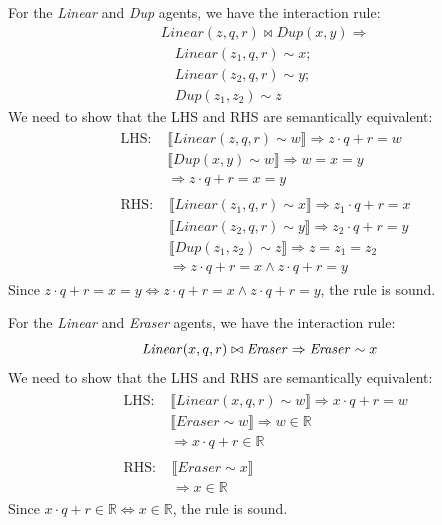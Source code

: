 \begin{lemma}
	For the \textit{Linear} and \textit{Dup} agents, we have the interaction rule:
	$$
	\begin{aligned}
		& \mathit{Linear}(z, q, r) \bowtie \mathit{Dup}(x, y) \Rightarrow \\
		& \quad \mathit{Linear}(z_1, q, r) \sim x; \\
		& \quad \mathit{Linear}(z_2, q, r) \sim y;	\\
		& \quad \mathit{Dup}(z_1, z_2) \sim z
	\end{aligned}
	$$
	We need to show that the LHS and RHS are semantically equivalent:
	$$
	\begin{aligned}
		& \begin{aligned}
			\text{LHS: } & \llbracket \mathit{Linear}(z, q, r) \sim w \rrbracket \Rightarrow z\cdot q + r = w \\
			& \llbracket \mathit{Dup}(x, y) \sim w \rrbracket \Rightarrow w = x = y \\
			& \Rightarrow z \cdot q + r = x = y
		\end{aligned} \\
		& \begin{aligned}
			\text{RHS: } & \llbracket \mathit{Linear}(z_1, q, r) \sim x \rrbracket \Rightarrow z_1 \cdot q + r = x \\
			& \llbracket \mathit{Linear}(z_2, q, r) \sim y \rrbracket \Rightarrow z_2 \cdot q + r = y \\
			& \llbracket \mathit{Dup}(z_1, z_2) \sim z \rrbracket \Rightarrow z = z_1 = z_2 \\
			& \Rightarrow z \cdot q + r = x \land z \cdot q + r = y
		\end{aligned}
	\end{aligned}
	$$
	Since $z \cdot q + r = x = y \iff z \cdot q + r = x \land z \cdot q + r = y$, the rule is sound.
\end{lemma}

\begin{lemma}
	For the \textit{Linear} and \textit{Eraser} agents, we have the interaction rule:
	$$
	\mathit{Linear}(x, q, r) \bowtie \mathit{Eraser} \Rightarrow \mathit{Eraser} \sim x \\
	$$
	We need to show that the LHS and RHS are semantically equivalent:
	$$
	\begin{aligned}
		& \begin{aligned}
			\text{LHS: } & \llbracket \mathit{Linear}(x, q, r) \sim w \rrbracket \Rightarrow x\cdot q + r = w \\
			& \llbracket \mathit{Eraser} \sim w \rrbracket \Rightarrow w \in \mathbb{R} \\
			& \Rightarrow x \cdot q + r \in \mathbb{R}
		\end{aligned} \\
		& \begin{aligned}
			\text{RHS: } & \llbracket \mathit{Eraser} \sim x \rrbracket \\
			& \Rightarrow x \in \mathbb{R}
		\end{aligned}
	\end{aligned}
	$$
	Since $x \cdot q + r \in \mathbb{R} \iff x \in \mathbb{R}$, the rule is sound.
\end{lemma}

